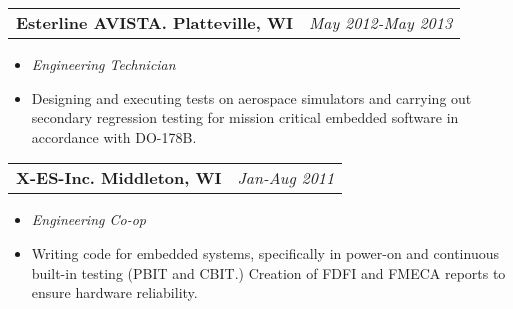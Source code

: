 \documentclass[margin, 11pt]{res}
\begin{document}
\begin{resume}
                 \begin{tabular}{p{4in} r}
               \textbf{Esterline AVISTA. Platteville, WI} & \emph{May 2012-May 2013}
                  \end{tabular}
	
                   \begin{itemize} %
                    \item[] \emph{Engineering Technician}
                    \item[] Designing and executing tests on aerospace simulators and carrying out secondary regression testing for mission critical embedded software in accordance with DO-178B.
		   \end{itemize}
		   
 		 		\begin{tabular}{p{4in} r}
                \textbf{ X-ES-Inc. Middleton, WI} & \emph{Jan-Aug 2011}
                 	\end{tabular}
                 	
		  \begin{itemize}
                   \item[] \emph{Engineering Co-op}
                   \item[] Writing code for embedded systems, specifically in power-on and continuous built-in testing (PBIT and CBIT.) Creation of FDFI and FMECA reports to ensure hardware reliability.
                  \end{itemize}


\end{resume}
\end{document}
